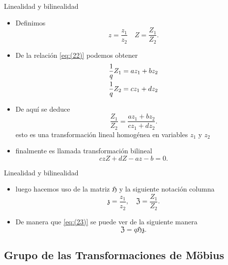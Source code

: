 \documentclass{beamer}
\begin{document}
\begin{frame}{Linealidad y bilinealidad}
    \begin{itemize}
        \item Definimos
        \begin{equation*}
            z=\frac{z_1}{z_2} \quad Z=\frac{Z_1}{Z_2}.
        \end{equation*}
        \item De la relación \eqref{eq:(22)} podemos obtener
        \begin{align}
            \frac{1}{q}Z_1&=az_1+bz_2\notag\\
            \frac{1}{q}Z_2&=cz_1+dz_2
            \label{eq:(23)}
        \end{align}
        \item De aquí se deduce
        \begin{equation*}
             \frac{Z_1}{Z_2}=\frac{az_1+bz_2}{cz_1+dz_2}.
        \end{equation*}
        esto es una transformación lineal homogénea en variables $z_1$ y $z_2$
        \item finalmente es llamada transformación bilineal
        \begin{equation}
            czZ+dZ-az-b=0.
            \label{eq:(25)}
        \end{equation}
    \end{itemize}
\end{frame}

\begin{frame}{Linealidad y bilinealidad}
    \begin{itemize}
        \item luego hacemos uso de la matriz $\mathfrak{H}$ y la siguiente notación columna
        \begin{equation*}
            \mathfrak{z}=\frac{z_1}{z_2}, \quad \mathfrak{Z}=\frac{Z_1}{Z_2}.
        \end{equation*}
        \item De manera que \eqref{eq:(23)} se puede ver de la siguiente manera
        \begin{equation}
            \mathfrak{Z}=q\mathfrak{H}\mathfrak{z}.
            \label{eq:(24)}
        \end{equation}
    \end{itemize}
\end{frame}

\subsection{Grupo de las Transformaciones de Möbius}
\end{document}
